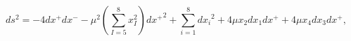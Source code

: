 \begin{equation}    \label{eq:IIBm2}
ds^2 = - 4 dx^+ dx^- -\mu^2 \left(\sum_{I=5}^8 x_I^2 \right) {dx^+}^2 +
 \sum_{i=1}^8 {dx_i}^2 + 4 \mu x_2 dx_1 dx^+ + 4 \mu x_4 dx_3 dx^+,
\end{equation}

